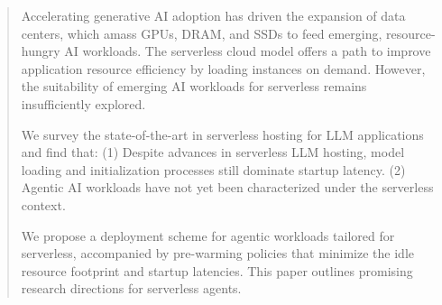 \begin{abstract}

Accelerating generative AI adoption has driven the expansion of data centers, which amass GPUs, DRAM, and SSDs to feed emerging, resource-hungry AI workloads.
The serverless cloud model offers a path to improve application resource efficiency by loading instances on demand. However, the suitability of emerging AI workloads for serverless remains insufficiently explored.

We survey the state-of-the-art in serverless hosting for LLM applications and find that:
(1) Despite advances in serverless LLM hosting, model loading and initialization processes still dominate startup latency.
(2) Agentic AI workloads have not yet been characterized under the serverless context.

We propose a deployment scheme for agentic workloads tailored for serverless, accompanied by pre-warming policies that minimize the idle resource footprint and startup latencies.   
This paper outlines promising research directions for serverless agents. 




\end{abstract}


